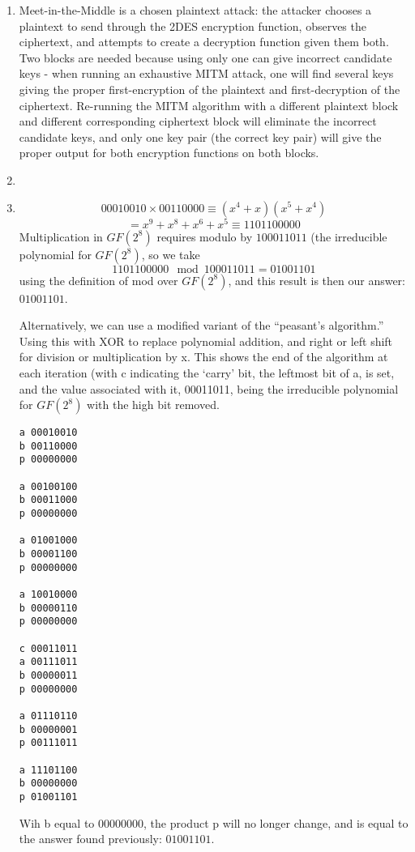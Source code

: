 \documentclass[12pt,letterpaper]{article}
\begin{document}
\pagestyle{fancy}
\rhead{\today}

\begin{enumerate}

    \item
        Meet-in-the-Middle is a chosen plaintext attack: the attacker chooses a plaintext to send through the 2DES encryption function, observes the ciphertext, and attempts to create a decryption function given them both.
        Two blocks are needed because using only one can give incorrect candidate keys - when running an exhaustive MITM attack, one will find several keys giving the proper first-encryption of the plaintext and first-decryption of the ciphertext.
        Re-running the MITM algorithm with a different plaintext block and different corresponding ciphertext block will eliminate the incorrect candidate keys, and only one key pair (the correct key pair) will give the proper output for both encryption functions on both blocks.

    \item

    \item
    $$00010010 \times 00110000 \equiv (x^4 + x)(x^5 + x^4)$$
    $$ = x^9 + x^8 + x^6 + x^5 \equiv 1101100000$$
    Multiplication in $GF(2^8)$ requires modulo by $100011011$ (the irreducible polynomial for $GF(2^8)$, so we take
    $$1101100000 \mod 100011011 = 01001101$$
    using the definition of mod over $GF(2^8)$, and this result is then our answer: $01001101$.

    Alternatively, we can use a modified variant of the ``peasant's algorithm.''  Using this with XOR to replace polynomial addition, and right or left shift for division or multiplication by x.  This shows the end of the algorithm at each iteration (with c indicating the `carry' bit, the leftmost bit of a, is set, and the value associated with it, 00011011, being the irreducible polynomial for $GF(2^8)$ with the high bit removed.
\begin{verbatim}
a 00010010
b 00110000
p 00000000

a 00100100
b 00011000
p 00000000

a 01001000
b 00001100
p 00000000

a 10010000
b 00000110
p 00000000

c 00011011
a 00111011
b 00000011
p 00000000

a 01110110
b 00000001
p 00111011

a 11101100
b 00000000
p 01001101
\end{verbatim}
    Wih b equal to $00000000$, the product p will no longer change, and is equal to the answer found previously: $01001101$.

\end{enumerate}
\end{document}
